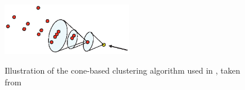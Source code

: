 



\begin{figure}[tbph]
\centering
{\includegraphics[width=0.5\textwidth]{pandora/coneClustering}}%
\caption{Illustration of the cone-based clustering algorithm used in \pandora, taken from \cite{Marshall:pandoraLC}}
\label{fig:pandoraConeClustering}
\end{figure}





